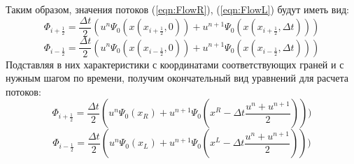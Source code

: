 \documentclass[10pt,a4paper]{article}
\begin{document}
Таким образом, значения потоков (\ref{eqn:FlowR}), (\ref{eqn:FlowL}) будут иметь вид:
\begin{equation}
\label{eqn:FlowRContPsi}
\Phi_{i+\frac{1}{2}}= \frac{\Delta t}{2}(
u^{n} \Psi_{0}(x(x_{i+\frac{1}{2}}, 0))
+
u^{n+1} \Psi_{0}(x(x_{i+\frac{1}{2}}, \Delta t))
)
\end{equation}
\begin{equation}
\label{eqn:FlowLContPsi}
\Phi_{i-\frac{1}{2}}= \frac{\Delta t}{2}(
u^n \Psi_{0}(x(x_{i-\frac{1}{2}}, 0))
+
u^{n+1} \Psi_{0}(x(x_{i-\frac{1}{2}}, \Delta t))
)
\end{equation}
Подставляя в них характеристики с координатами соответствующих граней и с нужным шагом по времени, получим окончательный вид уравнений для расчета потоков:
\begin{equation}
\label{eqn:FlowRContPsi}
\Phi_{i+\frac{1}{2}}= \frac{\Delta t}{2}(
u^{n} \Psi_{0}(x_R)
+
u^{n+1} \Psi_{0}(x^R-\Delta t \frac{u^n+u^{n+1}}{2}))
)
\end{equation}
\begin{equation}
\label{eqn:FlowLContPsi}
\Phi_{i-\frac{1}{2}}= \frac{\Delta t}{2}(
u^{n} \Psi_{0}(x_L)
+
u^{n+1} \Psi_{0}(x^L-\Delta t \frac{u^n+u^{n+1}}{2}))
)
\end{equation}
\end{document}
